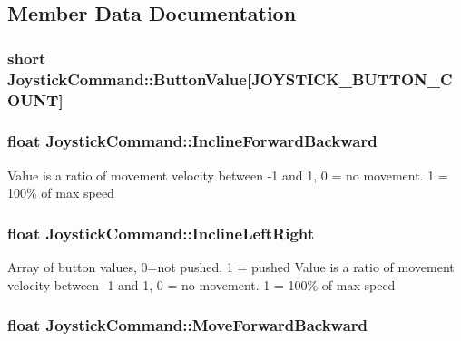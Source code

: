 \subsection{Member Data Documentation}
\hypertarget{struct_joystick_command_abe14f0b7b117048aa1c7f9626a669035}{
\subsubsection[{Button\-Value}]{\setlength{\rightskip}{0pt plus 5cm}short Joystick\-Command\-::\-Button\-Value\mbox{[}{\bf J\-O\-Y\-S\-T\-I\-C\-K\-\_\-\-B\-U\-T\-T\-O\-N\-\_\-\-C\-O\-U\-N\-T}\mbox{]}}}\label{struct_joystick_command_abe14f0b7b117048aa1c7f9626a669035}
\hypertarget{struct_joystick_command_ac1ac2e83b68ea20eba3e92935b966ba6}{
\subsubsection[{Incline\-Forward\-Backward}]{\setlength{\rightskip}{0pt plus 5cm}float Joystick\-Command\-::\-Incline\-Forward\-Backward}}\label{struct_joystick_command_ac1ac2e83b68ea20eba3e92935b966ba6}
Value is a ratio of movement velocity between -\/1 and 1, 0 = no movement. 1 = 100\% of max speed \hypertarget{struct_joystick_command_a357b7ffd95720084658487aee12662c8}{
\subsubsection[{Incline\-Left\-Right}]{\setlength{\rightskip}{0pt plus 5cm}float Joystick\-Command\-::\-Incline\-Left\-Right}}\label{struct_joystick_command_a357b7ffd95720084658487aee12662c8}
Array of button values, 0=not pushed, 1 = pushed Value is a ratio of movement velocity between -\/1 and 1, 0 = no movement. 1 = 100\% of max speed \hypertarget{struct_joystick_command_a9ca8ffe74ba1717de22528f71b0e5592}{
\subsubsection[{Move\-Forward\-Backward}]{\setlength{\rightskip}{0pt plus 5cm}float Joystick\-Command\-::\-Move\-Forward\-Backward}}\label{struct_joystick_command_a9ca8ffe74ba1717de22528f71b0e5592}
